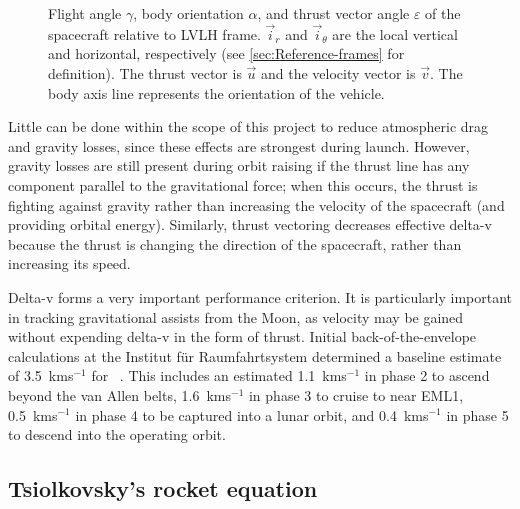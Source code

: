 \begin{figure}
\centering
\def\svgwidth{0.4\textwidth}

\caption{Flight angle $\gamma$, body orientation $\alpha$, and thrust vector angle $\varepsilon$ of the spacecraft relative to LVLH frame. $\vec{i}_r$ and $\vec{i}_\theta$ are the local vertical and horizontal, respectively (see \autoref{sec:Reference-frames} for definition). The thrust vector is $\vec{u}$ and the velocity vector is $\vec{v}$. The body axis line represents the orientation of the vehicle.} 
\label{fig:path-angles}
\end{figure}

Little can be done within the scope of this project to reduce atmospheric drag and gravity losses, since these effects are strongest during launch. However, gravity losses are still present during orbit raising if the thrust line has any component parallel to the gravitational force; when this occurs, the thrust is fighting against gravity rather than increasing the velocity of the spacecraft (and providing orbital energy). Similarly, thrust vectoring decreases effective delta-v because the thrust is changing the direction of the spacecraft, rather than increasing its speed. 
 
Delta-v forms a very important performance criterion. It is particularly important in tracking gravitational assists from the Moon, as velocity may be gained without expending delta-v in the form of thrust. Initial back-of-the-envelope calculations at the Institut f\"{u}r Raumfahrtsystem determined a baseline estimate of 3.5~kms$^{-1}$ for \BW\ \parencite{Roeser2006}. This includes an estimated 1.1~kms$^{-1}$ in phase 2 to ascend beyond the van Allen belts, 1.6~kms$^{-1}$ in phase 3 to cruise to near EML1, 0.5~kms$^{-1}$ in phase 4 to be captured into a lunar orbit, and 0.4~kms$^{-1}$ in phase 5 to descend into the operating orbit.

\subsection{Tsiolkovsky's rocket equation} \label{sec:Tsiolkovsky}


